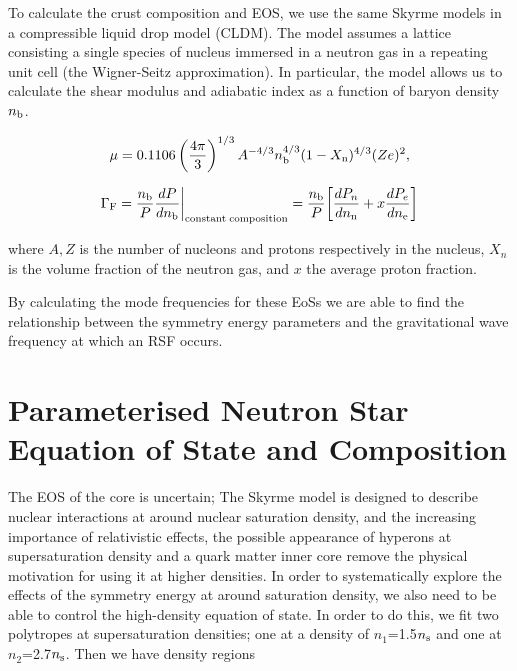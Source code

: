\documentclass[fleqn,usenatbib]{mnras}
\begin{document}
To calculate the crust composition and EOS, we use the same Skyrme models in a compressible liquid drop model (CLDM). The model assumes a lattice consisting  a single species of nucleus immersed in a neutron gas in a repeating unit cell (the Wigner-Seitz approximation). In particular, the model allows us to calculate the shear modulus and adiabatic index as a function of baryon density $n_{\rm b}$. 

\begin{equation} \label{eq:shear_mod}
	\mu = 0.1106 \left(\frac{4\pi}{3}\right)^{1/3} A^{-4/3} n_{\rm b}^{4/3} (1-X_{\rm n})^{4/3} (Ze)^2,
\end{equation}

\begin{equation}
\Gamma_{\rm F} = \frac{n_{\rm b}}{P} \frac{dP}{dn_{\rm b}}\bigg|_{\rm constant \; composition} =  \frac{n_{\rm b}}{P} \bigg[\frac{dP_n}{dn_{\rm n}} +  x \frac{dP_e}{dn_{\rm e}}  \bigg]
\end{equation}

\noindent where $A,Z$ is the number of nucleons and protons  respectively in the nucleus, $X_n$ is the volume fraction of the neutron gas, and $x$ the average proton fraction.

By calculating the mode frequencies for these EoSs we are able to find the relationship between the symmetry energy parameters and the gravitational wave frequency at which an RSF occurs.







\section{Parameterised Neutron Star Equation of State and Composition}


The EOS of the core is uncertain; The Skyrme model is designed to describe nuclear interactions at around nuclear saturation density, and the increasing importance of relativistic effects,  the possible appearance of hyperons at supersaturation density and a quark matter inner core remove the physical motivation for using it at higher densities. In order to systematically explore the effects of the symmetry energy at around saturation density, we also need to be able to control the high-density equation of state. In order to do this, we fit two polytropes at supersaturation densities; one at a density of $n_1$=1.5$n_{\rm s}$ and one at $n_2$=2.7$n_{\rm s}$. Then we have density regions
\end{document}
